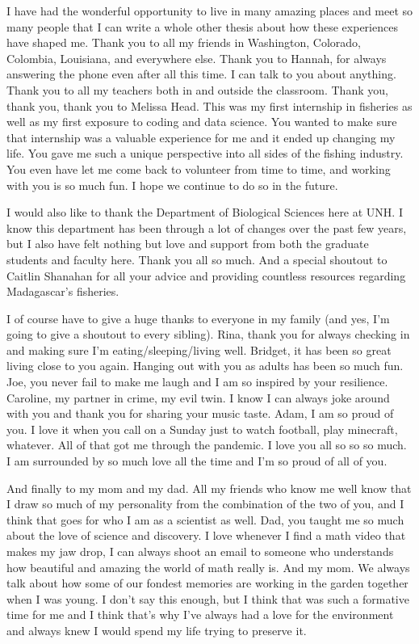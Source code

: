 \documentclass[
  12pt,
]{article}
\begin{document}
I have had the wonderful opportunity to live in many amazing places and meet so many people that I can write a whole other thesis about how these experiences have shaped me. Thank you to all my friends in Washington, Colorado, Colombia, Louisiana, and everywhere else. Thank you to Hannah, for always answering the phone even after all this time. I can talk to you about anything. Thank you to all my teachers both in and outside the classroom. Thank you, thank you, thank you to Melissa Head. This was my first internship in fisheries as well as my first exposure to coding and data science. You wanted to make sure that internship was a valuable experience for me and it ended up changing my life. You gave me such a unique perspective into all sides of the fishing industry. You even have let me come back to volunteer from time to time, and working with you is so much fun. I hope we continue to do so in the future.

I would also like to thank the Department of Biological Sciences here at UNH. I know this department has been through a lot of changes over the past few years, but I also have felt nothing but love and support from both the graduate students and faculty here. Thank you all so much. And a special shoutout to Caitlin Shanahan for all your advice and providing countless resources regarding Madagascar's fisheries.

I of course have to give a huge thanks to everyone in my family (and yes, I'm going to give a shoutout to every sibling). Rina, thank you for always checking in and making sure I'm eating/sleeping/living well. Bridget, it has been so great living close to you again. Hanging out with you as adults has been so much fun. Joe, you never fail to make me laugh and I am so inspired by your resilience. Caroline, my partner in crime, my evil twin. I know I can always joke around with you and thank you for sharing your music taste. Adam, I am so proud of you. I love it when you call on a Sunday just to watch football, play minecraft, whatever. All of that got me through the pandemic. I love you all so so so much. I am surrounded by so much love all the time and I'm so proud of all of you.

And finally to my mom and my dad. All my friends who know me well know that I draw so much of my personality from the combination of the two of you, and I think that goes for who I am as a scientist as well. Dad, you taught me so much about the love of science and discovery. I love whenever I find a math video that makes my jaw drop, I can always shoot an email to someone who understands how beautiful and amazing the world of math really is. And my mom. We always talk about how some of our fondest memories are working in the garden together when I was young. I don't say this enough, but I think that was such a formative time for me and I think that's why I've always had a love for the environment and always knew I would spend my life trying to preserve it.
\end{document}
